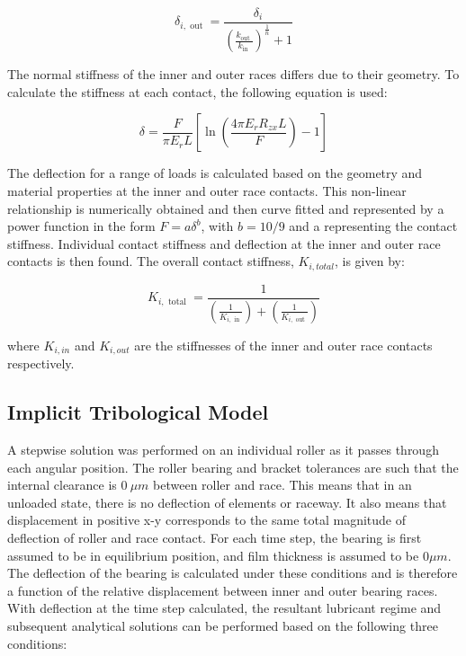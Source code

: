 \begin{equation}\label{Deflection at each contact}
	\delta_{i, \text { out }}=\frac{\delta_i}{\left(\frac{k_{\text {out }}}{k_{\text {in }}}\right)^{\frac{1}{n}}+1}
\end{equation}

The normal stiffness of the inner and outer races differs due to their geometry. To calculate the stiffness at each contact, the following equation is used: 

\begin{equation}\label{Contact stiffness experimental}
	\delta=\frac{F}{\pi E_r L}\left[\ln \left(\frac{4 \pi E_r R_{z x} L}{F}\right)-1\right]
\end{equation}

The deflection for a range of loads is calculated based on the geometry and material properties at the inner and outer race contacts. This non-linear relationship is numerically obtained and then curve fitted and represented by a power function in the form $F=a\delta^b$, with $b=10/9$ and a representing the contact stiffness. Individual contact stiffness and deflection at the inner and outer race contacts is then found. The overall contact stiffness, $K_{i,total}$, is given by:

\begin{equation}\label{Overall contact stiffness}
	K_{i, \text { total }}=\frac{1}{\left(\frac{1}{K_{i, \text { in }}}\right)+\left(\frac{1}{K_{i, \text { out }}}\right)}
\end{equation}

where $K_{i,in}$ and $K_{i,out}$ are the stiffnesses of the inner and outer race contacts respectively.

\subsection{Implicit Tribological Model}

A stepwise solution was performed on an individual roller as it passes through each angular position. The roller bearing and bracket tolerances are such that the internal clearance is $0~\mu m$ between roller and race. This means that in an unloaded state, there is no deflection of elements or raceway. It also means that displacement in positive x-y corresponds to the same total magnitude of deflection of roller and race contact. For each time step, the bearing is first assumed to be in equilibrium position, and film thickness is assumed to be $0 \mu m$. The deflection of the bearing is calculated under these conditions and is therefore a function of the relative displacement between inner and outer bearing races. With deflection at the time step calculated, the resultant lubricant regime and subsequent analytical solutions can be performed based on the following three conditions:

